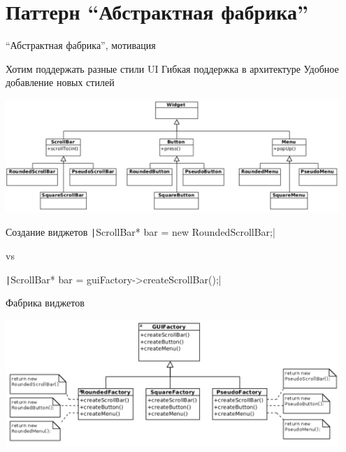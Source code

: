 \documentclass{../../slides-style}
\begin{document}
    \begin{frame}[plain]
        \titlepage
    \end{frame}

    \section{Паттерн \enquote{Абстрактная фабрика}}

    \begin{frame}{\enquote{Абстрактная фабрика}, мотивация}
        \begin{outline}
            \1 Хотим поддержать разные стили UI
                \2 Гибкая поддержка в архитектуре
                \2 Удобное добавление новых стилей
        \end{outline}
        \begin{center}
            \includegraphics[width=0.95\textwidth]{widgets.png}
        \end{center}
    \end{frame}

    \begin{frame}{Создание виджетов}
        \texttt|ScrollBar* bar = new RoundedScrollBar;|
        
        \vspace{2mm}
        
        vs
        
        \vspace{2mm}
        
        \texttt|ScrollBar* bar = guiFactory->createScrollBar();|
    \end{frame}

    \begin{frame}{Фабрика виджетов}
        \begin{center}
            \includegraphics[width=0.95\textwidth]{widgetFactory.png}
        \end{center}
    \end{frame}
\end{document}
